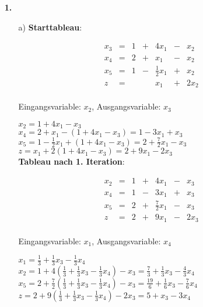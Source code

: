 \documentclass[a4paper,11pt]{article}
\author{\authorinfo}
\title{\titleinfo}
\date{\today}
\begin{document}
\maketitle
\begin{enumerate}
\item[\textbf{1.}]
    \begin{enumerate}
    \item[a)]
        \textbf{Starttableau}:

        \[\begin{array}{rcrcrcr}
            x_3 & = & 1 & + & 4 x_1 & - & x_2 \\
            x_4 & = & 2 & + &   x_1 & - & x_2 \\
            x_5 & = & 1 & - & \frac{1}{2} x_1 & + & x_2 \\ \hline
              z & = &   &   &   x_1 & + & 2 x_2 \\
        \end{array}\]

        Eingangsvariable: $x_2$, Ausgangsvariable: $x_3$

        \( x_2 = 1 + 4 x_1 - x_3 \) \\[3pt]
        \( x_4 = 2 + x_1 - (1 + 4 x_1 - x_3) = 1 - 3 x_1 + x_3 \) \\[3pt]
        \( x_5 = 1 - \frac{1}{2} x_1 + (1 + 4 x_1 - x_3) = 2 + \frac{7}{2} x_1 - x_3 \) \\[3pt]
        \( z = x_1 + 2 (1 + 4 x_1 - x_3) = 2 + 9x_1 - 2 x_3 \) \\[3pt]

        \textbf{Tableau nach 1. Iteration}:

        \[\begin{array}{rcrcrcr}
            x_2 & = & 1 & + & 4 x_1 & - & x_3 \\[3pt]
            x_4 & = & 1 & - & 3 x_1 & + & x_3 \\[3pt]
            x_5 & = & 2 & + & \frac{7}{2} x_1 & - & x_3 \\[3pt] \hline
              z & = & 2 & + & 9 x_1 & - & 2 x_3 \\
        \end{array}\]

        Eingangsvariable: $x_1$, Ausgangsvariable: $x_4$

        \( x_1 = \frac{1}{3} + \frac{1}{3} x_3 - \frac{1}{3} x_4 \) \\[3pt]
        \( x_2 = 1 + 4(\frac{1}{3} + \frac{1}{3} x_3 - \frac{1}{3} x_4) - x_3 = \frac{7}{3} + \frac{1}{3} x_3 - \frac{4}{3} x_4 \) \\[3pt]
        \( x_5 = 2 + \frac{7}{2} (\frac{1}{3} + \frac{1}{3} x_3 - \frac{1}{3} x_4) - x_3 = \frac{19}{6} + \frac{1}{6}x_3 - \frac{7}{6}x_4 \) \\[3pt]
        \( z = 2 + 9(\frac{1}{3} + \frac{1}{3} x_3 - \frac{1}{3} x_4) - 2 x_3 = 5 + x_3 - 3 x_4 \) \\[3pt]


\end{enumerate}
\end{enumerate}
\end{document}
